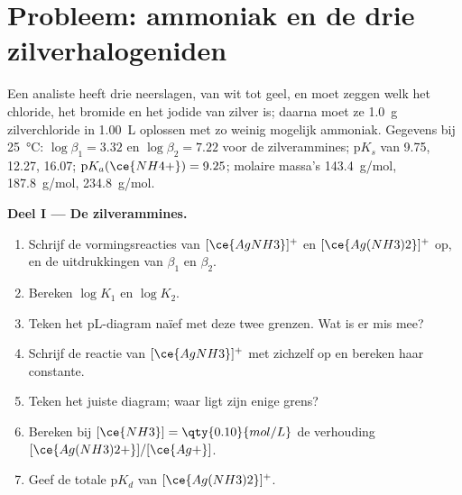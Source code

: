 \section{Probleem: ammoniak en de drie zilverhalogeniden}

\begin{problem}
\label{pb:b1:complexation:1}
Een analiste heeft drie neerslagen, van wit tot geel, en moet zeggen welk
het chloride, het bromide en het jodide van zilver is; daarna moet ze
\qty{1.0}{g} zilverchloride in \qty{1.00}{L} oplossen met zo weinig
mogelijk ammoniak. Gegevens bij \qty{25}{\celsius}: $\log\beta_1 = 3.32$
en $\log\beta_2 = 7.22$ voor de zilverammines; $\mathrm{p}K_s$ van
 9.75,  12.27,  16.07;
$\mathrm{p}K_a(\ce{NH4+}) = 9.25$; molaire massa's 
\qty{143.4}{g/mol},  \qty{187.8}{g/mol},
 \qty{234.8}{g/mol}.

\medskip
\noindent\textbf{Deel I --- De zilverammines.}
\begin{enumerate}
  \item Schrijf de vormingsreacties van $[\ce{AgNH3}]^{+}$ en
        $[\ce{Ag(NH3)2}]^{+}$ op, en de uitdrukkingen van $\beta_1$ en
        $\beta_2$.
  \item Bereken $\log K_1$ en $\log K_2$.
  \item Teken het pL-diagram naïef met deze twee grenzen. Wat is er mis
        mee?
  \item Schrijf de reactie van $[\ce{AgNH3}]^{+}$ met zichzelf op en
        bereken haar constante.
  \item Teken het juiste diagram; waar ligt zijn enige grens?
  \item Bereken bij $[\ce{NH3}] = \qty{0.10}{mol/L}$ de verhouding
        $[\ce{Ag(NH3)2+}]/[\ce{Ag+}]$.
  \item Geef de totale  $\mathrm{p}K_d$ van
        $[\ce{Ag(NH3)2}]^{+}$.
\end{enumerate}


\end{problem}
